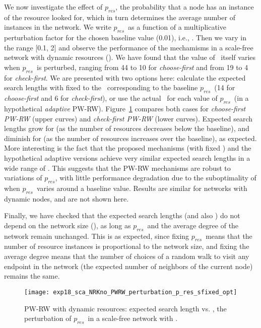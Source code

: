 \documentclass[]{elsarticle}
\newcommand{\pnoderes}  {\ensuremath{p_{res}}}
\begin{document}
We now investigate the effect of \pnoderes, the probability that a node has an instance of the resource looked for, which in turn determines the average number of instances in the network. We write \pnoderes\ as a function of a multiplicative perturbation factor  for the chosen baseline value (0.01), i.e., . Then we vary  in the range [0.1, 2] and observe the performance of the mechamisms in a scale-free network with dynamic resources (). We have found that the value of \sopt\ itself varies when \pnoderes\ is perturbed, ranging from 44 to 10 for \emph{choose-first} and from 19 to 4 for \emph{check-first}. We are presented with two options here: calculate the expected search lengths with  fixed to the \sopt\ corresponding to the baseline \pnoderes\ (14 for \emph{choose-first} and 6 for \emph{check-first}), or use the actual \sopt\ for each value of \pnoderes\ (in a hypothetical \emph{adaptive} PW-RW). Figure~\ref{fig:scalefree_perturbation_pres_dynres} compares both cases for \emph{choose-first PW-RW} (upper curves) and \emph{check-first PW-RW} (lower curves). Expected search lengths grow for  (as the number of resources decreases below the baseline), and diminish for  (as the number of resources increases over the baseline), as expected. More interesting is the fact that the proposed mechanisms (with fixed ) and the hypothetical adaptive versions achieve very similar expected search lengths in a wide range of . This suggests that the PW-RW mechanisms are robust to variations of \pnoderes, with little performance degradation due to the suboptimality of  when \pnoderes\ varies around a baseline value. Results are similar for networks with dynamic nodes, and are not shown here.

Finally, we have checked that the expected search lengths (and also \sopt) do not depend on the network size (), as long as \pnoderes\ and the average degree of the network remain unchanged. This is as expected, since fixing \pnoderes\ means that the number of resource instances is proportional to the network size, and fixing the average degree means that the number of choices of a random walk to visit any endpoint in the network (the expected number of neighbors of the current node) remains the same.

\begin{figure}
 \centering
 \texttt{[image: exp18\_sca\_NRKno\_PWRW\_perturbation\_p\_res\_sfixed\_opt]}
 \caption{PW-RW with dynamic resources: expected search length  vs. , the perturbation of \pnoderes\ in a scale-free network with .}
 \label{fig:scalefree_perturbation_pres_dynres}
\end{figure}
\end{document}
